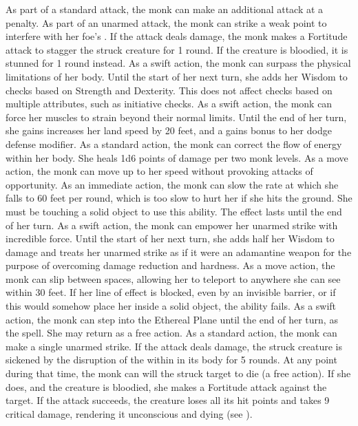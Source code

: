  As part of a standard attack, the monk can make an additional attack at a  penalty.
 As part of an unarmed attack, the monk can strike a weak point to interfere with her foe's \ki. If the attack deals damage, the monk makes a Fortitude attack to stagger the struck creature for 1 round. If the creature is bloodied, it is stunned for 1 round instead.
 As a swift action, the monk can surpass the physical limitations of her body. Until the start of her next turn, she adds her Wisdom to checks based on Strength and Dexterity. This does not affect checks based on multiple attributes, such as initiative checks.
 As a swift action, the monk can force her muscles to strain beyond their normal limits. Until the end of her turn, she gains increases her land speed by 20 feet, and a gains  bonus to her dodge defense modifier.
 As a standard action, the monk can correct the flow of energy within her body. She heals 1d6 points of damage per two monk levels.
 As a move action, the monk can move up to her speed without provoking attacks of opportunity.
 As an immediate action, the monk can slow the rate at which she falls to 60 feet per round, which is too slow to hurt her if she hits the ground. She must be touching a solid object to use this ability. The effect lasts until the end of her turn.
 As a swift action, the monk can empower her unarmed strike with incredible force. Until the start of her next turn, she adds half her Wisdom to damage and treats her unarmed strike as if it were an adamantine weapon for the purpose of overcoming damage reduction and hardness.
 As a move action, the monk can slip between spaces, allowing her to teleport to anywhere she can see within 30 feet. If her line of effect is blocked, even by an invisible barrier, or if this would somehow place her inside a solid object, the ability fails. 
 As a swift action, the monk can step into the Ethereal Plane until the end of her turn, as the  spell. She may return as a free action.
 As a standard action, the monk can make a single unarmed strike. If the attack deals damage, the struck creature is sickened by the disruption of the \ki within in its body for 5 rounds. At any point during that time, the monk can will the struck target to die (a free action). If she does, and the creature is bloodied, she makes a Fortitude attack against the target. If the attack succeeds, the creature loses all its hit points and takes 9 critical damage, rendering it unconscious and dying (see ).
